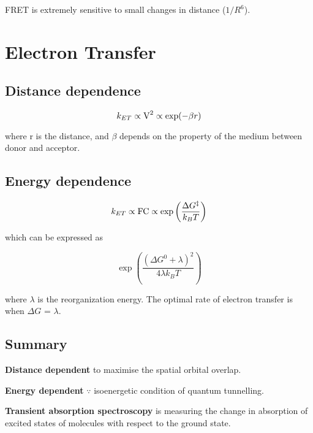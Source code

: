 FRET is extremely sensitive to small changes in distance ($1/R^6$).
\vspace{\baselineskip}

\section{Electron Transfer}

\subsection*{Distance dependence}
$$k_{ET} \propto \ce{V^2} \propto \exp(-\beta r)$$

where r is the distance, and $\beta$ depends on the property of the medium between donor and acceptor.

\subsection*{Energy dependence}
$$k_{ET} \propto \ce{FC} \propto \exp \left( \frac{\Delta G^{\ddag}}{k_B T} \right)$$

which can be expressed as

$$\exp \left( \frac{(\Delta G^{0} + \lambda)^2}{4 \lambda k_B T} \right)$$

where $\lambda$ is the reorganization energy. The optimal rate of electron transfer is when $\Delta G$ = $\lambda$.
\vspace{\baselineskip}

\subsection*{Summary}
\textbf{Distance dependent} to maximise the spatial orbital overlap.

\textbf{Energy dependent} $\because$ isoenergetic condition of quantum tunnelling.
\vspace{\baselineskip}

\textbf{Transient absorption spectroscopy} is measuring the change in absorption of excited states of molecules with respect to the ground state.
\vspace{\baselineskip}